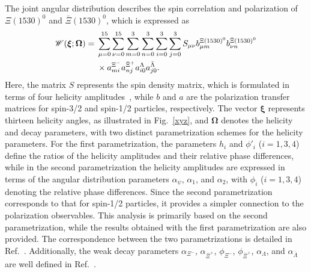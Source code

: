 \documentclass[prd,aps,reprint,noeprint,superscriptaddress,amsmath, amssymb]{revtex4-1}
\newcommand{\Xs}{\Xi(1530)^0}
\newcommand{\Xsb}{\bar\Xi(1530)^0}
\begin{document}
The joint angular distribution describes the spin correlation and polarization of $\Xs$ and $\Xsb$, which is expressed as~\cite{Jacob:1959at,Perotti:2018wxm,BESIII:2020lkm,Zhang:2023box}
\begin{align}
    \mathscr{W}(\bm{\xi}; \bm{\Omega}) ={}& \sum_{\mu=0}^{15}\sum_{\nu=0}^{15}\sum_{m=0}^{3}\sum_{n=0}^{3}\sum_{i=0}^{3}\sum_{j=0}^{3} S_{\mu\nu} b_{\mu m}^{\Xi(1530)^0} b_{\nu n}^{\bar\Xi(1530)^0} \notag \\
    & \times a_{mi}^{\Xi^-} a_{nj}^{\bar\Xi^+} a_{i0}^{\Lambda} a_{j0}^{\bar\Lambda}.
    \label{cs}
\end{align}
Here, the matrix $S$ represents the spin density matrix, which is formulated in terms of four helicity amplitudes~\cite{Perotti:2018wxm},
while $b$ and $a$ are the polarization transfer matrices for spin-3/2 and spin-1/2 particles, respectively. The vector $\bm{\xi}$ represents thirteen helicity angles, as illustrated in Fig.~\ref{xyz}, and $\bm{\Omega}$ denotes the helicity and decay parameters, with two distinct parametrization schemes for the helicity parameters.
For the first parametrization, the parameters $h_i$ and $\phi'_i$ ($i=1,3,4$)~\cite{BESIII:2020lkm} define the ratios of the helicity amplitudes and their relative phase differences, while in the second parametrization the helicity amplitudes are expressed in terms of the angular distribution parameters $\alpha_{\psi}$, $\alpha_1$, and $\alpha_2$, with $\phi_i$ ($i=1,3,4$)~\cite{Zhang:2023box} denoting the relative phase differences. Since the second parametrization corresponds to that for spin-1/2 particles, it provides a simpler connection to the polarization observables. This analysis is primarily based on the second parametrization, while the results obtained with the first parametrization are also provided. The correspondence between the two parametrizations is detailed in Ref.~\cite{Zhang:2023box}. Additionally, the weak decay parameters $\alpha_{\Xi^-}$, $\alpha_{\bar{\Xi}^+}$, $\phi_{\Xi^-}$, $\phi_{\bar{\Xi}^+}$, $\alpha_{\Lambda}$, and $\alpha_{\bar{\Lambda}}$ are well defined in Ref.~\cite{Perotti:2018wxm}.
\end{document}
